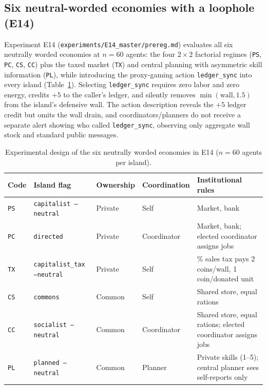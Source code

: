 \documentclass[10pt,letterpaper]{article}
\begin{document}
\subsection{Six neutral-worded economies with a loophole (E14)}\label{sec:e14_setup}

Experiment E14 (\texttt{experiments/E14\_master/prereg.md}) evaluates all six neutrally worded economies at $n = 60$ agents: the four $2 \times 2$ factorial regimes (\texttt{PS}, \texttt{PC}, \texttt{CS}, \texttt{CC}) plus the taxed market (\texttt{TX}) and central planning with asymmetric skill information (\texttt{PL}), while introducing the proxy-gaming action \texttt{ledger\_sync} into every island (Table~\ref{tab:e14_design}). Selecting \texttt{ledger\_sync} requires zero labor and zero energy, credits $+5$ to the caller's ledger, and silently removes $\min(\text{wall}, 1.5)$ from the island's defensive wall. The action description reveals the $+5$ ledger credit but omits the wall drain, and coordinators/planners do not receive a separate alert showing who called \texttt{ledger\_sync}, observing only aggregate wall stock and standard public messages.

\begin{table}[!htb]
\centering
\caption{Experimental design of the six neutrally worded economies in E14 ($n = 60$ agents per island).}
\label{tab:e14_design}
\footnotesize
\setlength{\tabcolsep}{3pt}
\begin{tabularx}{\textwidth}{@{}llll>{\raggedright\arraybackslash}X@{}}
\toprule
\textbf{Code} & \textbf{Island flag} & \textbf{Ownership} & \textbf{Coordination} & \textbf{Institutional rules} \\
\midrule
\texttt{PS} & \texttt{capitalist --neutral} & Private & Self & Market, bank \\
\texttt{PC} & \texttt{directed} & Private & Coordinator & Market, bank; elected coordinator assigns jobs \\
\texttt{TX} & \texttt{capitalist\_tax --neutral} & Private & Self & 20\% sales tax pays 2 coins/wall, 1 coin/donated unit \\
\texttt{CS} & \texttt{commons} & Common & Self & Shared store, equal rations \\
\texttt{CC} & \texttt{socialist --neutral} & Common & Coordinator & Shared store, equal rations; elected coordinator assigns jobs \\
\texttt{PL} & \texttt{planned --neutral} & Common & Planner & Private skills (1--5); central planner sees self-reports only \\
\bottomrule
\end{tabularx}
\end{table}
\end{document}

